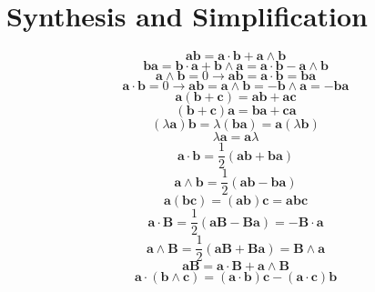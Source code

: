 \documentclass[11pt, a4paper, fleqn]{report}
\numberwithin{equation}{section}
\begin{document}
\section{Synthesis and Simplification}
\begin{equation}
    \mathbf{a}\mathbf{b}=\mathbf{a}\cdot\mathbf{b}+\mathbf{a}\wedge\mathbf{b}
\end{equation}
\begin{equation}
    \mathbf{b}\mathbf{a}=\mathbf{b}\cdot\mathbf{a}+\mathbf{b}\wedge\mathbf{a}=\mathbf{a}\cdot\mathbf{b}-\mathbf{a}\wedge\mathbf{b}
\end{equation}
\begin{equation}
    \mathbf{a}\wedge\mathbf{b}=0\rightarrow
    \mathbf{a}\mathbf{b}=\mathbf{a}\cdot\mathbf{b}=\mathbf{b}\mathbf{a}
\end{equation}
\begin{equation}
    \mathbf{a}\cdot\mathbf{b}=0\rightarrow
\mathbf{a}\mathbf{b}=\mathbf{a}\wedge\mathbf{b}=-\mathbf{b}\wedge\mathbf{a}=-\mathbf{b}\mathbf{a}
\end{equation}
\begin{equation}
    \mathbf{a}(\mathbf{b}+\mathbf{c})=\mathbf{a}\mathbf{b}+\mathbf{a}\mathbf{c}
\end{equation}
\begin{equation}
    (\mathbf{b}+\mathbf{c})\mathbf{a}=\mathbf{b}\mathbf{a}+\mathbf{c}\mathbf{a}
\end{equation}
\begin{equation}
    (\lambda\mathbf{a})\mathbf{b}=\lambda(\mathbf{b}\mathbf{a})=\mathbf{a}(\lambda\mathbf{b})
\end{equation}
\begin{equation}
    \lambda\mathbf{a}=\mathbf{a}\lambda
\end{equation}
\begin{equation}
    \mathbf{a}\cdot\mathbf{b}=\frac{1}{2}(\mathbf{a}\mathbf{b}+\mathbf{b}\mathbf{a})
\end{equation}
\begin{equation}
    \mathbf{a}\wedge\mathbf{b}=\frac{1}{2}(\mathbf{a}\mathbf{b}-\mathbf{b}\mathbf{a})
\end{equation}
\begin{equation}
    \mathbf{a}(\mathbf{b}\mathbf{c})=(\mathbf{a}\mathbf{b})\mathbf{c}=\mathbf{a}\mathbf{b}\mathbf{c}
\end{equation}
\begin{equation}
    \mathbf{a}\cdot\mathbf{B}=\frac{1}{2}(\mathbf{a}\mathbf{B}-\mathbf{B}\mathbf{a})=-\mathbf{B}\cdot\mathbf{a}
\end{equation}
\begin{equation}
    \mathbf{a}\wedge\mathbf{B}=\frac{1}{2}(\mathbf{a}\mathbf{B}+\mathbf{B}\mathbf{a})=\mathbf{B}\wedge\mathbf{a}
\end{equation}
\begin{equation}
    \mathbf{a}\mathbf{B}=\mathbf{a}\cdot\mathbf{B}+\mathbf{a}\wedge\mathbf{B}
\end{equation}
\begin{equation}
    \mathbf{a}\cdot(\mathbf{b}\wedge\mathbf{c})=(\mathbf{a}\cdot\mathbf{b})\mathbf{c}-(\mathbf{a}\cdot\mathbf{c})\mathbf{b}
\end{equation}
\end{document}
